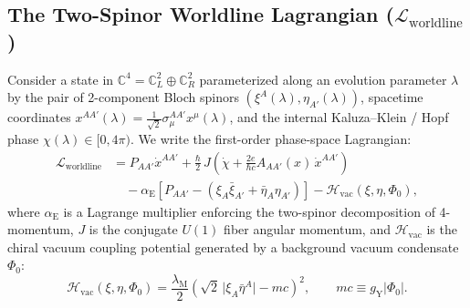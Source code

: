 \documentclass[11pt,a4paper]{article}
\begin{document}
\subsection{The Two-Spinor Worldline Lagrangian (\texorpdfstring{$\mathcal{L}_{\text{worldline}}$}{L\_worldline})}
Consider a state in $\mathbb{C}^4 = \mathbb{C}^2_L \oplus \mathbb{C}^2_R$ parameterized along an evolution parameter $\lambda$ by the pair of 2-component Bloch spinors $(\xi^A(\lambda), \eta_{A'}(\lambda))$, spacetime coordinates $x^{AA'}(\lambda) = \frac{1}{\sqrt{2}}\sigma_\mu^{AA'}x^\mu(\lambda)$, and the internal Kaluza--Klein / Hopf phase $\chi(\lambda) \in [0, 4\pi)$. We write the first-order phase-space Lagrangian:
\begin{equation}
\begin{aligned}
\mathcal{L}_{\text{worldline}} &= P_{AA'} \dot{x}^{AA'} + \frac{\hbar}{2}\, J \left( \dot{\chi} + \frac{2e}{\hbar c} A_{AA'}(x)\, \dot{x}^{AA'} \right) \\
&\quad - \alpha_{\text{E}}\left[ P_{AA'} - \left( \xi_A \bar{\xi}_{A'} + \bar{\eta}_A \eta_{A'} \right) \right] - \mathcal{H}_{\text{vac}}(\xi, \eta, \Phi_0),
\end{aligned}
\end{equation}
where $\alpha_{\text{E}}$ is a Lagrange multiplier enforcing the two-spinor decomposition of 4-momentum, $J$ is the conjugate $U(1)$ fiber angular momentum, and $\mathcal{H}_{\text{vac}}$ is the chiral vacuum coupling potential generated by a background vacuum condensate $\Phi_0$:
\begin{equation}
\mathcal{H}_{\text{vac}}(\xi, \eta, \Phi_0) = \frac{\lambda_{\text{M}}}{2} \left( \sqrt{2}\,\big|\xi_A \bar{\eta}^A\big| - m c \right)^2, \qquad m c \equiv g_{\text{Y}} |\Phi_0|.
\end{equation}
\end{document}
